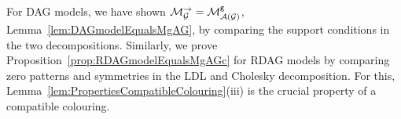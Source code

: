 %		

For DAG models, we have shown $\mathcal{M}_{\mathcal{G}}^{\to} = \mathcal{M}^{\mathtt{g}}_{\mathcal{A}(\mathcal{G})}$, Lemma~\ref{lem:DAGmodelEqualsMgAG}, by comparing the support conditions in the two decompositions.
Similarly, we prove Proposition~\ref{prop:RDAGmodelEqualsMgAGc} for RDAG models by comparing zero patterns and symmetries in the LDL and Cholesky decomposition. For this, Lemma~\ref{lem:PropertiesCompatibleColouring}(iii) is the crucial property of a compatible colouring.

